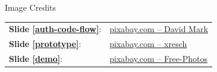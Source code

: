 \documentclass[aspectratio=169]{beamer}
\begin{document}
\makeref

\begin{frame}{Image Credits}
	\footnotesize
	\begin{tabular}{ll}
		\textbf{Slide \ref{auth-code-flow}}: & \href{https://pixabay.com/images/id-1751463/}{pixabay.com -- David Mark} \\
		\textbf{Slide \ref{prototype}}: & \href{https://pixabay.com/images/id-4056027/}{pixabay.com -- xresch} \\
		\textbf{Slide \ref{demo}}:& \href{https://pixabay.com/images/id-1209641/}{pixabay.com -- Free-Photos}
	\end{tabular}
\end{frame}
\end{document}
